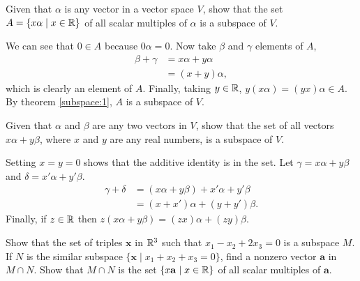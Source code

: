 \documentclass[../../main.tex]{subfiles}
\begin{document}
\begin{problem}
	Given that $\alpha$ is any vector in a vector space $V$, show that the set $A = \{x\alpha \mid x \in \mathbb{R} \}$ of all scalar multiples of $\alpha$ is a subspace of $V$.
\end{problem}
\begin{solution}
	We can see that $0 \in A$  because $0 \alpha = 0$. Now take $\beta$ and $\gamma$ elements of $A$, 
	\begin{align*}
		\beta + \gamma &= x \alpha + y \alpha \\ 
		&= (x + y)\alpha,
	\end{align*}
	which is clearly an element of $A$. Finally, taking $y \in \mathbb{R}$, $y(x\alpha) = (yx) \alpha \in A$.
	By theorem \ref{subspace:1}, $A$ is a subspace of $V$.
\end{solution}
\begin{problem}
	Given that $\alpha$ and $\beta$ are any two vectors in $V$, show that the set of all vectors $x\alpha + y\beta$, where $x$ and $y$ are any real numbers, is a subspace of $V$.
\end{problem}
\begin{solution}
	Setting $x = y = 0$ shows that the additive identity is in the set. Let $\gamma = x\alpha + y\beta$ and $\delta = x'\alpha + y'\beta$.
	\begin{align*}
		\gamma + \delta &= (x\alpha + y\beta) + x'\alpha + y'\beta \\
						&= (x+x')\alpha + (y + y')\beta.
	\end{align*}
	Finally, if $z \in \mathbb{R}$ then $z(x\alpha + y\beta) = (zx)\alpha + (zy)\beta$.
\end{solution}
\begin{problem}
	Show that the set of triples $\mathbf{x}$ in $\mathbb{R}^3$ such that $x_1 - x_2 + 2x_3 = 0$ is a subspace $M$. If $N$ is the similar subspace $\{ \mathbf{x} \mid x_1 + x_2 + x_3 = 0 \}$, find a nonzero vector $\textbf{a}$ in $M \cap N$. Show that $M \cap N$ is the set $\{x\mathbf{a} \mid x \in \mathbb{R} \}$ of all scalar multiples of $\mathbf{a}$.
\end{problem}
\end{document}
